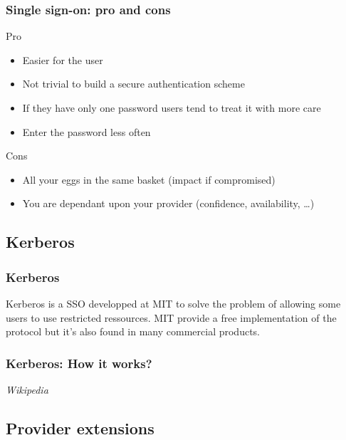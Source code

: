 \begin{frame}
\frametitle{Single sign-on: pro and cons}

\begin{block}{Pro}
\begin{itemize}
\item Easier for the user
\item Not trivial to build a secure authentication scheme
\item If they have only one password users tend to treat it with more care
\item Enter the password less often
\end{itemize}
\end{block}

\begin{block}{Cons}
\begin{itemize}
\item All your eggs in the same basket (impact if compromised)
\item You are dependant upon your provider (confidence, availability, \ldots)
\end{itemize}
\end{block}

\end{frame}


\subsection{Kerberos}


\begin{frame}
\frametitle{Kerberos}

Kerberos is a SSO developped at MIT to solve the problem of allowing
some users to use restricted ressources. MIT provide a free
implementation of the protocol but it's also found in many commercial
products.

\end{frame}


\begin{frame}
\frametitle{Kerberos: How it works?}
\textit{Wikipedia}
\end{frame}

\subsection{Provider extensions}

